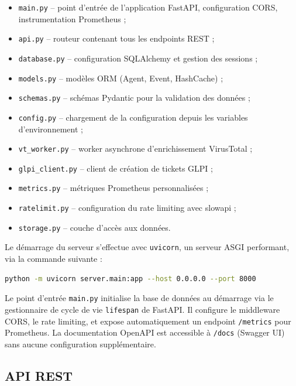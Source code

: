 \begin{itemize}
  \item \texttt{main.py} -- point d'entrée de l'application FastAPI,
    configuration CORS, instrumentation Prometheus ;
  \item \texttt{api.py} -- routeur contenant tous les endpoints REST ;
  \item \texttt{database.py} -- configuration SQLAlchemy et gestion des
    sessions ;
  \item \texttt{models.py} -- modèles ORM (Agent, Event, HashCache) ;
  \item \texttt{schemas.py} -- schémas Pydantic pour la validation des
    données ;
  \item \texttt{config.py} -- chargement de la configuration depuis les
    variables d'environnement ;
  \item \texttt{vt\_worker.py} -- worker asynchrone d'enrichissement
    VirusTotal ;
  \item \texttt{glpi\_client.py} -- client de création de tickets GLPI ;
  \item \texttt{metrics.py} -- métriques Prometheus personnalisées ;
  \item \texttt{ratelimit.py} -- configuration du rate limiting avec
    slowapi ;
  \item \texttt{storage.py} -- couche d'accès aux données.
\end{itemize}

Le démarrage du serveur s'effectue avec \texttt{uvicorn}, un serveur ASGI
performant, via la commande suivante :

\begin{lstlisting}[language=bash, caption={Lancement du serveur EDR}, label={lst:edr-launch}]
python -m uvicorn server.main:app --host 0.0.0.0 --port 8000
\end{lstlisting}

Le point d'entrée \texttt{main.py} initialise la base de données au
démarrage via le gestionnaire de cycle de vie \texttt{lifespan} de
FastAPI. Il configure le middleware CORS, le rate limiting, et expose
automatiquement un endpoint \texttt{/metrics} pour Prometheus. La
documentation OpenAPI est accessible à \texttt{/docs} (Swagger UI) sans
aucune configuration supplémentaire.

\subsection{API REST}

